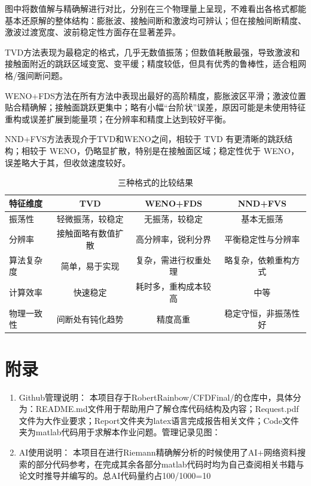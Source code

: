 \documentclass[12pt,a4paper]{article}%
\begin{document}
		图中将数值解与精确解进行对比，分别在三个物理量上呈现，不难看出各格式都能基本还原解的整体结构：膨胀波、接触间断和激波均可辨认；但在接触间断精度、激波过渡宽度、波前稳定性方面存在显著差异。
		
		TVD方法表现为最稳定的格式，几乎无数值振荡；但数值耗散最强，导致激波和接触面附近的跳跃区域变宽、变平缓；精度较低，但具有优秀的鲁棒性，适合粗网格/强间断问题。
		
		WENO+FDS方法在所有方法中表现出最好的高阶精度，膨胀波区平滑；激波位置贴合精确解；接触面跳跃更集中；略有小幅“台阶状”误差，原因可能是未使用特征重构或误差扩展到能量项；在分辨率和精度上达到较好平衡。
		
		NND+FVS方法表现介于TVD和WENO之间，相较于 TVD 有更清晰的跳跃结构；相较于 WENO，仍略显扩散，特别是在接触面区域；稳定性优于 WENO，误差略大于其，但收敛速度较好。
		
		\begin{table}[H]
			\centering
			\caption{三种格式的比较结果}
			\begin{tabular}{lccc}
				\toprule
				特征维度 & TVD & WENO+FDS & NND+FVS \\
				\midrule
				振荡性       & 轻微振荡，较稳定   & 无振荡，较稳定     & 基本无振荡 \\
				分辨率  & 接触面略有数值扩散     & 高分辨率，锐利分界   & 平衡稳定性与分辨率 \\
				算法复杂度   & 简单，易于实现   & 复杂，需进行权重处理     & 略复杂，依赖重构方式 \\
				计算效率 & 快速稳定 & 耗时多，重构成本较高 & 中等 \\
				物理一致性 & 间断处有钝化趋势 & 精度高重 & 稳定守恒，非振荡性好 \\
				\bottomrule
			\end{tabular}
		\end{table}
		
	\section{附录}
		\begin{enumerate}
			\item Github管理说明：
			本项目存于RobertRainbow/CFDFinal/的仓库中，具体分为：README.md文件用于帮助用户了解仓库代码结构及内容；Request.pdf文件为大作业要求；Report文件夹为latex语言完成报告相关文件；Code文件夹为matlab代码用于求解本作业问题。管理记录见图：
			
			\item AI使用说明：
			本项目在进行Riemann精确解分析的时候使用了AI+网络资料搜索的部分代码参考，在完成其余各部分matlab代码时均为自己查阅相关书籍与论文时推导并编写的。总AI代码量约占100/1000=10%
		\end{enumerate}
	
\end{document}
